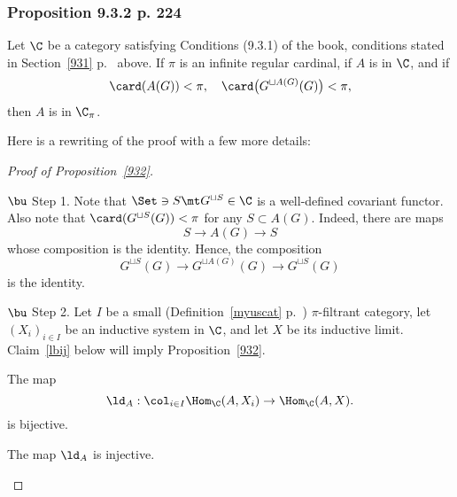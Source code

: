 \documentclass[12pt]{article}
\theoremstyle{remark}
\theoremstyle{definition}
\begin{document}
%

\subsubsection{Proposition 9.3.2 p. 224}

\begin{prop}[Proposition 9.3.2 p.~224] 
Let $\C$ be a category satisfying Conditions (9.3.1) of the book, conditions stated in Section~\ref{931} p.~ above. If $\pi$ is an infinite regular cardinal, if $A$ is in $\C$, and if 
$$
\card(A(G))<\pi,\quad\card\big(G^{\sqcup A(G)}(G)\big)<\pi,
$$ 
then $A$ is in $\C_\pi$.
\end{prop}

Here is a rewriting of the proof with a few more details:

\begin{proof}[Proof of Proposition~\ref{932}]${}$ 

\nn$\bu$ Step 1. Note that $\Set\ni S\mt G^{\sqcup S}\in\C$ is a well-defined covariant functor. Also note that $\card(G^{\sqcup S}(G))<\pi$ for any $S\subset A(G)$. Indeed, there are maps 
$$
S\to A(G)\to S
$$ 
whose composition is the identity. Hence, the composition 
$$
G^{\sqcup S}(G)\to G^{\sqcup A(G)}(G)\to G^{\sqcup S}(G)
$$ 
is the identity.

\nn$\bu$ Step 2. Let $I$ be a small (Definition~\ref{myuscat} p.~) $\pi$-filtrant category, let $(X_i)_{i\in I}$ be an inductive system in $\C$, and let $X$ be its inductive limit. Claim~\ref{lbij} below will imply Proposition~\ref{932}. 

\begin{claim} 
The map 
$$
\ld_A:\col_{i\in I}\Hom_\C(A,X_i)\to\Hom_\C(A,X).
$$ 
is bijective. 
\end{claim}

\begin{claim} 
The map $\ld_A$ is injective. 
\end{claim} 


\end{proof}
\end{document}
